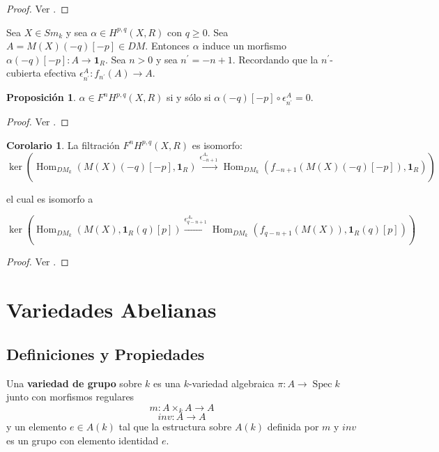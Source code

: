 \documentclass[10pt]{amsart}
\theoremstyle{definition}
\newtheorem{cor}[definition]{Corolario}
\newtheorem{proposition}[definition]{Proposici\'on}
\theoremstyle{remark}
\theoremstyle{definition}
\begin{document}
\begin{proof}
Ver \cite[Thm. 5.2.4]{Pel17}.
\end{proof}

Sea $X \in Sm_{\mathit{k}}$ y sea $\alpha \in H^{p,q}(X,R)$ con $q \geq 0$. Sea $A=M(X)(-q)[-p] \in DM$. Entonces $\alpha$ induce un morfismo $\alpha(-q)[-p]:A \rightarrow \textbf{1}_{R}$. Sea $n>0$ y sea $n^{\prime}=-n+1$. Recordando que la $n^{\prime}$-cubierta efectiva $\epsilon^{A}_{n^{\prime}}:f_{n^{\prime}}(A) \rightarrow A$.

\begin{proposition}
$\alpha \in F^{n}H^{p,q}(X,R)$ si y s\'olo si $\alpha(-q)[-p] \circ \epsilon^{A}_{n^\prime}=0$.


\end{proposition}

\begin{proof}
Ver \cite[Prop. 5.3.2]{Pel17}.
\end{proof}

\begin{cor}
La filtración $F^{n}H^{p,q}(X,R)$ es isomorfo:
\begin{equation*}
\ker(\operatorname{Hom}_{DM_{k}}(M(X)(-q)[-p],\textbf{1}_{R})  \stackrel{\epsilon^{A_{*}}_{-n+1}}{\longrightarrow} \operatorname{Hom}_{DM_{k}}(f_{-n+1}(M(X)(-q)[-p]),\textbf{1}_{R}))
\end{equation*}

el cual es isomorfo a

\begin{equation*}\label{fil1}
\ker(\operatorname{Hom}_{DM_{k}}(M(X),\textbf{1}_{R}(q)[p])  \stackrel{\epsilon^{A_{*}}_{q-n+1}}{\longrightarrow} \operatorname{Hom}_{DM_{k}}(f_{q-n+1}(M(X)),\textbf{1}_{R}(q)[p]))
\end{equation*}
\end{cor}

\begin{proof}
Ver \cite[Cor. 5.3.3]{Pel17}.
\end{proof}


\newpage

\section{Variedades Abelianas}
\subsection{Definiciones y Propiedades}
Una \textbf{variedad de grupo} sobre $\mathit{k}$ es una $\mathit{k}$-variedad algebraica $\pi:A \rightarrow \operatorname{Spec}\mathit{k}$ junto con morfismos regulares
\begin{equation*}
m:A \times_{\mathit{k}} A \rightarrow A
\end{equation*}
\begin{equation*}
inv:A \rightarrow A
\end{equation*}
 y un elemento $e \in A(\mathit{k})$ tal que la estructura sobre $A(\mathit{k})$ definida por $m$ y $inv$ es un grupo con elemento identidad $e$.
\end{document}
